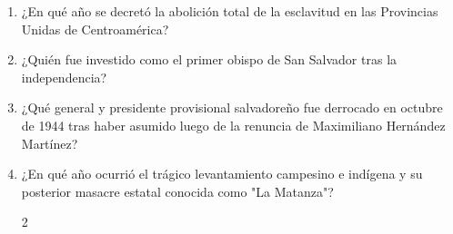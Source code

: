 \documentclass[10pt,a4paper]{article}
\begin{document}
\begin{enumerate}[label=\textbf{\arabic*.}]
\begin{enumerate}[label=\textbf{\Alph*)}]
\end{enumerate}
\vspace{0.15cm}
\item ¿En qué año se decretó la abolición total de la esclavitud en las Provincias Unidas de Centroamérica?
\begin{enumerate}[label=\textbf{\Alph*)}]
\end{enumerate}
\vspace{0.15cm}
\item ¿Quién fue investido como el primer obispo de San Salvador tras la independencia?
\begin{enumerate}[label=\textbf{\Alph*)}]
\end{enumerate}
\vspace{0.15cm}
\item ¿Qué general y presidente provisional salvadoreño fue derrocado en octubre de 1944 tras haber asumido luego de la renuncia de Maximiliano Hernández Martínez?
\begin{enumerate}[label=\textbf{\Alph*)}]
\end{enumerate}
\vspace{0.15cm}
\item ¿En qué año ocurrió el trágico levantamiento campesino e indígena y su posterior masacre estatal conocida como "La Matanza"?
\begin{enumerate}[label=\textbf{\Alph*)}]
\begin{multicols}{2}

\end{multicols}
\end{enumerate}
\end{enumerate}
\end{document}
